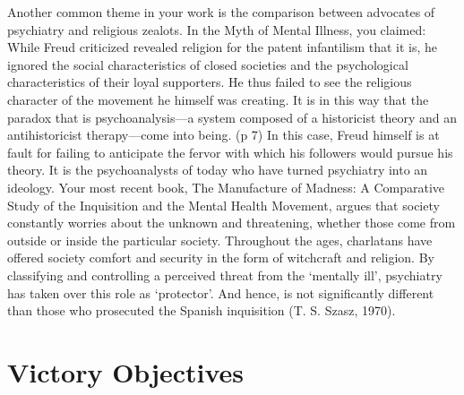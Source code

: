 Another common theme in your work is the comparison between advocates of psychiatry and religious zealots. In the Myth of Mental Illness, you claimed:
While Freud criticized revealed religion for the patent infantilism that it is, he ignored the social characteristics of closed societies and the psychological characteristics of their loyal supporters. He thus failed to see the religious character of the movement he himself was creating. It is in this way that the paradox that is psychoanalysis—a system composed of a historicist theory and an antihistoricist therapy—come into being. (p 7)
In this case, Freud himself is at fault for failing to anticipate the fervor with which his followers would pursue his theory. It is the psychoanalysts of today who have turned psychiatry into an ideology.
Your most recent book, The Manufacture of Madness: A Comparative Study of the Inquisition and the Mental Health Movement, argues that society constantly worries about the unknown and threatening, whether those come from outside or inside the particular society. Throughout the ages, charlatans have offered society comfort and security in the form of witchcraft and religion. By classifying and controlling a perceived threat from the ‘mentally ill’, psychiatry has taken over this role as ‘protector’. And hence, is not significantly different than those who prosecuted the Spanish inquisition (T. S. Szasz, 1970).

\section{Victory Objectives}
\label{victoryobjectives}

